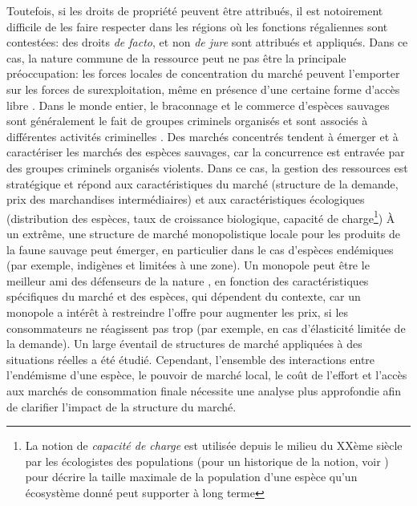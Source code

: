 Toutefois, si les droits de propriété peuvent être attribués, il est notoirement difficile de les faire respecter dans les régions où les fonctions régaliennes sont contestées: des droits \textit{de facto}, et non \textit{de jure} sont attribués et appliqués. Dans ce cas, la nature commune de la ressource peut ne pas être la principale préoccupation: les forces locales de concentration du marché peuvent l'emporter sur les forces de surexploitation, même en présence d'une certaine forme d'accès libre \citep{damania_economics_2007}.  Dans le monde entier, le braconnage et le commerce d'espèces sauvages sont généralement le fait de groupes criminels organisés et sont associés à différentes activités criminelles \citep{mozer_introduction_2023}.  Des marchés concentrés tendent à émerger et à caractériser les marchés des espèces sauvages, car la concurrence est entravée par des groupes criminels organisés violents. Dans ce cas, la gestion des ressources est stratégique et répond aux caractéristiques du marché (structure de la demande, prix des marchandises intermédiaires) et aux caractéristiques écologiques (distribution des espèces, taux de croissance biologique, capacité de charge\footnote{La notion de \textit{capacité de charge} est utilisée depuis le milieu du XXème siècle par les écologistes des populations (pour un historique de la notion, voir \cite{sayre_carrying_2008}) pour décrire la taille maximale de la population d'une espèce qu'un écosystème donné peut supporter à long terme})
À un extrême, une structure de marché monopolistique locale pour les produits de la faune sauvage peut émerger, en particulier dans le cas d'espèces endémiques (par exemple, indigènes et limitées à une zone). Un monopole peut être le meilleur ami des défenseurs de la nature \citep{solow_resources_1974, hannesson_note_1983}, en fonction des caractéristiques spécifiques du marché et des espèces, qui dépendent du contexte, car un monopole a intérêt à restreindre l'offre pour augmenter les prix, si les consommateurs ne réagissent pas trop (par exemple, en cas d'élasticité limitée de la demande). Un large éventail de structures de marché \citep{damania_economics_2007, hannesson_effects_1985} appliquées à des situations réelles a été étudié. Cependant, l'ensemble des interactions entre l'endémisme d'une espèce, le pouvoir de marché local, le coût de l'effort et l'accès aux marchés de consommation finale nécessite une analyse plus approfondie afin de clarifier l'impact de la structure du marché.

